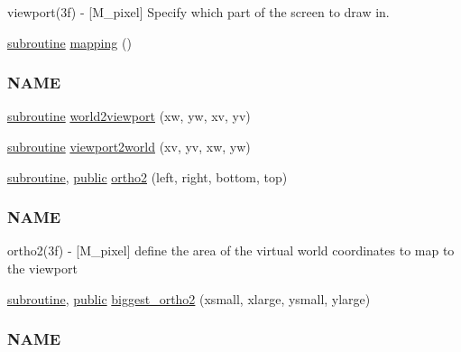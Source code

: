\begin{DoxyCompactItemize}
\begin{DoxyCompactList}
viewport(3f) -\/ \mbox{[}M\+\_\+pixel\mbox{]} Specify which part of the screen to draw in. \end{DoxyCompactList}\item 
\hyperlink{M__stopwatch_83_8txt_acfbcff50169d691ff02d4a123ed70482}{subroutine} \hyperlink{namespacem__pixel_a84c841de62fc0addddeff305c4ede9d4}{mapping} ()
\begin{DoxyCompactList}\small\item\em \subsubsection*{N\+A\+ME}\end{DoxyCompactList}\item 
\hyperlink{M__stopwatch_83_8txt_acfbcff50169d691ff02d4a123ed70482}{subroutine} \hyperlink{namespacem__pixel_a9d4aea8ae2eb15317b83fa03a11371b2}{world2viewport} (xw, yw, xv, yv)
\item 
\hyperlink{M__stopwatch_83_8txt_acfbcff50169d691ff02d4a123ed70482}{subroutine} \hyperlink{namespacem__pixel_a9e23c9a3a5f3b1482986f067fbf8487f}{viewport2world} (xv, yv, xw, yw)
\item 
\hyperlink{M__stopwatch_83_8txt_acfbcff50169d691ff02d4a123ed70482}{subroutine}, \hyperlink{M__stopwatch_83_8txt_a2f74811300c361e53b430611a7d1769f}{public} \hyperlink{namespacem__pixel_a80dece6adac704024a5a76efee697770}{ortho2} (left, right, bottom, top)
\begin{DoxyCompactList}\small\item\em \subsubsection*{N\+A\+ME}

ortho2(3f) -\/ \mbox{[}M\+\_\+pixel\mbox{]} define the area of the virtual world coordinates to map to the viewport \end{DoxyCompactList}\item 
\hyperlink{M__stopwatch_83_8txt_acfbcff50169d691ff02d4a123ed70482}{subroutine}, \hyperlink{M__stopwatch_83_8txt_a2f74811300c361e53b430611a7d1769f}{public} \hyperlink{namespacem__pixel_accc2eab6fbc7b453afa34e1e2c834223}{biggest\+\_\+ortho2} (xsmall, xlarge, ysmall, ylarge)
\begin{DoxyCompactList}\small\item\em \subsubsection*{N\+A\+ME}


\end{DoxyCompactList}
\end{DoxyCompactItemize}
